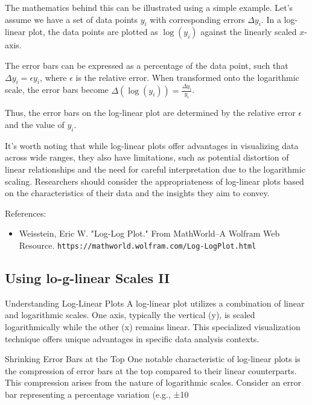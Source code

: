 \documentclass{article}
\begin{document}
The mathematics behind this can be illustrated using a simple example. Let's assume we have a set of data points $y_i$ with corresponding errors $\Delta y_i$. In a log-linear plot, the data points are plotted as $\log(y_i)$ against the linearly scaled $x$-axis.

The error bars can be expressed as a percentage of the data point, such that $\Delta y_i = \epsilon y_i$, where $\epsilon$ is the relative error. When transformed onto the logarithmic scale, the error bars become $\Delta(\log(y_i)) = \frac{\Delta y_i}{y_i}$. 

Thus, the error bars on the log-linear plot are determined by the relative error $\epsilon$ and the value of $y_i$.

It's worth noting that while log-linear plots offer advantages in visualizing data across wide ranges, they also have limitations, such as potential distortion of linear relationships and the need for careful interpretation due to the logarithmic scaling. Researchers should consider the appropriateness of log-linear plots based on the characteristics of their data and the insights they aim to convey.

References:
\begin{itemize}
    \item Weisstein, Eric W. "Log-Log Plot." From MathWorld--A Wolfram Web Resource. \texttt{https://mathworld.wolfram.com/Log-LogPlot.html}
\end{itemize}

\subsection{Using lo-g-linear Scales II}

Understanding Log-Linear Plots
A log-linear plot utilizes a combination of linear and logarithmic scales. One axis, typically the vertical (y), is scaled logarithmically while the other (x) remains linear. This specialized visualization technique offers unique advantages in specific data analysis contexts.

Shrinking Error Bars at the Top
One notable characteristic of log-linear plots is the compression of error bars at the top compared to their linear counterparts. This compression arises from the nature of logarithmic scales. Consider an error bar representing a percentage variation (e.g., ±10%
\end{document}
